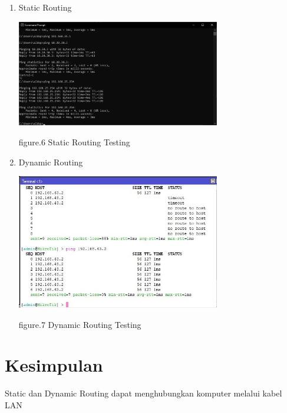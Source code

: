 \begin{enumerate}
    \item Static Routing 
    
    \begin{center}
        \includegraphics[width=0.7\textwidth]{image/P2/static/static-test.jpg}    
        
        figure.6 Static Routing Testing
    \end{center}

    \item Dynamic Routing 
    
    \begin{center}
        \includegraphics[width=0.7\textwidth]{image/P2/dynamic/dynamic-test.jpg}    
        
        figure.7 Dynamic Routing Testing
    \end{center}

\end{enumerate}

\section{Kesimpulan}

Static dan Dynamic Routing dapat menghubungkan komputer melalui kabel LAN 
